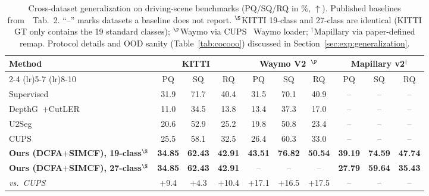 \documentclass[10pt,twocolumn,letterpaper]{article}
\begin{document}
\begin{table}[t]
\centering
\footnotesize
\setlength{\tabcolsep}{4pt}
\begin{tabular}{l c c c c c c c c c}
\toprule
\multirow{2}{*}{Method} & \multicolumn{3}{c}{KITTI~\cite{geiger2012kitti}} & \multicolumn{3}{c}{Waymo V2~\cite{sun2020waymo}$^{\P}$} & \multicolumn{3}{c}{Mapillary v2$^{\dagger}$} \\
\cmidrule(lr){2-4} \cmidrule(lr){5-7} \cmidrule(lr){8-10}
& PQ & SQ & RQ & PQ & SQ & RQ & PQ & SQ & RQ \\
\midrule
\rowcolor{black!5} Supervised~\cite{kirillov2019panoptic} & 31.9 & 71.7 & 40.4 & 31.5 & 70.1 & 40.9 & -- & -- & -- \\
\midrule
DepthG~\cite{sick2024depthg}$+$CutLER~\cite{wang2023cutler} & 11.0 & 34.5 & 13.8 & 13.4 & 37.3 & 17.0 & -- & -- & -- \\
U2Seg~\cite{niu2024u2seg} & 20.6 & 52.9 & 25.2 & 19.8 & 50.8 & 23.4 & -- & -- & -- \\
CUPS~\cite{hahn2025cups} & 25.5 & 58.1 & 32.5 & 26.4 & 60.3 & 33.0 & -- & -- & -- \\
\midrule
\textbf{Ours (DCFA$+$SIMCF), 19-class}$^{\S}$ & \textbf{34.85} & \textbf{62.43} & \textbf{42.91} & \textbf{43.51} & \textbf{76.82} & \textbf{50.54} & \textbf{39.19} & \textbf{74.59} & \textbf{47.74} \\
\textbf{Ours (DCFA$+$SIMCF), 27-class}$^{\S}$ & \textbf{34.85} & \textbf{62.43} & \textbf{42.91} & -- & -- & -- & \textbf{27.79} & \textbf{59.64} & \textbf{35.43} \\
\midrule
\textit{vs.\ CUPS~\cite{hahn2025cups}} & \textcolor{green!50!black}{$+$9.4} & \textcolor{green!50!black}{$+$4.3} & \textcolor{green!50!black}{$+$10.4} & \textcolor{green!50!black}{$+$17.1} & \textcolor{green!50!black}{$+$16.5} & \textcolor{green!50!black}{$+$17.5} & -- & -- & -- \\
\bottomrule
\end{tabular}
\caption{Cross-dataset generalization on driving-scene benchmarks (PQ/SQ/RQ in \%, $\uparrow$). Published baselines from~\cite{hahn2025cups}~Tab.~2. ``--'' marks datasets a baseline does not report. $^{\S}$KITTI 19-class and 27-class are identical (KITTI GT only contains the 19 standard classes); $^{\P}$Waymo via CUPS~\cite{hahn2025cups} Waymo loader; $^{\dagger}$Mapillary via paper-defined remap. Protocol details and OOD sanity (Table~\ref{tab:cocooo}) discussed in Section~\ref{sec:exp:generalization}.}
\label{tab:transfer}
\end{table}
\end{document}
